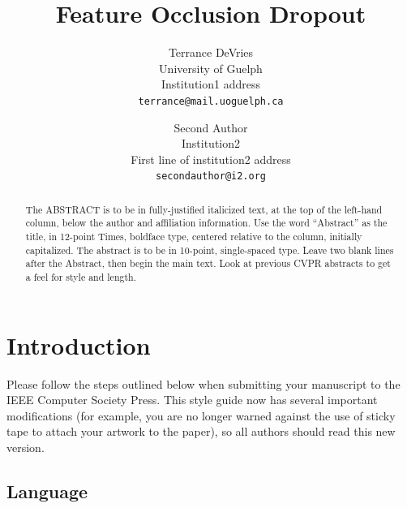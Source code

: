 \documentclass[10pt,twocolumn,letterpaper]{article}
\begin{document}
\title{Feature Occlusion Dropout}

\author{Terrance DeVries\\
University of Guelph\\
Institution1 address\\
{\tt\small terrance@mail.uoguelph.ca}
\and
Second Author\\
Institution2\\
First line of institution2 address\\
{\tt\small secondauthor@i2.org}
}

\maketitle

\begin{abstract}
   The ABSTRACT is to be in fully-justified italicized text, at the top
   of the left-hand column, below the author and affiliation
   information. Use the word ``Abstract'' as the title, in 12-point
   Times, boldface type, centered relative to the column, initially
   capitalized. The abstract is to be in 10-point, single-spaced type.
   Leave two blank lines after the Abstract, then begin the main text.
   Look at previous CVPR abstracts to get a feel for style and length.
\end{abstract}

\section{Introduction}

Please follow the steps outlined below when submitting your manuscript to
the IEEE Computer Society Press.  This style guide now has several
important modifications (for example, you are no longer warned against the
use of sticky tape to attach your artwork to the paper), so all authors
should read this new version.

\subsection{Language}
\end{document}
